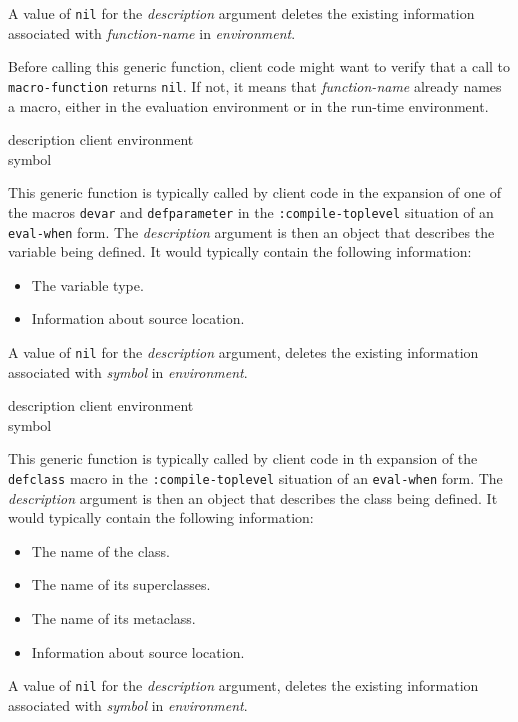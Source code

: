 A value of \texttt{nil} for the \textit{description} argument deletes
the existing information associated with \textit{function-name} in
\textit{environment}.

Before calling this generic function, client code might want to verify
that a call to \texttt{macro-function} returns \texttt{nil}.  If not,
it means that \textit{function-name} already names a macro, either in
the evaluation environment or in the run-time environment.

{\small{} {description client environment \\
symbol}
}

This generic function is typically called by client code in the expansion of
one of the macros \texttt{devar} and \texttt{defparameter} in the
\texttt{:compile-toplevel} situation of an \texttt{eval-when} form.  The
\textit{description} argument is then an object that describes the variable
being defined.  It would typically contain the following information:

\begin{itemize}
\item The variable type.
\item Information about source location.
\end{itemize}

A value of \texttt{nil} for the \textit{description} argument, deletes
the existing information associated with \textit{symbol} in
\textit{environment}.

{\small{} {description client environment \\
symbol}
}

This generic function is typically called by client code in th expansion of
the \texttt{defclass} macro in the \texttt{:compile-toplevel} situation of an
\texttt{eval-when} form.  The \textit{description} argument is then an object
that describes the class being defined.  It would typically contain the
following information:

\begin{itemize}
\item The name of the class.
\item The name of its superclasses.
\item The name of its metaclass.
\item Information about source location.
\end{itemize}

A value of \texttt{nil} for the \textit{description} argument, deletes
the existing information associated with \textit{symbol} in
\textit{environment}.

